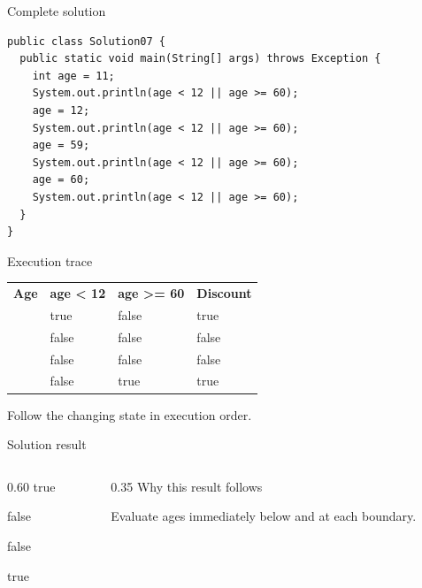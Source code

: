\documentclass[10pt,aspectratio=169]{beamer}
\begin{document}
\begin{frame}[fragile,t]{Complete solution}
\begin{lstlisting}
public class Solution07 {
  public static void main(String[] args) throws Exception {
    int age = 11;
    System.out.println(age < 12 || age >= 60);
    age = 12;
    System.out.println(age < 12 || age >= 60);
    age = 59;
    System.out.println(age < 12 || age >= 60);
    age = 60;
    System.out.println(age < 12 || age >= 60);
  }
}
\end{lstlisting}
\end{frame}

\begin{frame}[fragile,t]{Execution trace}
\small\renewcommand{\arraystretch}{1.5}
\begin{tabularx}{\textwidth}{>{\raggedright\arraybackslash}X>{\raggedright\arraybackslash}X>{\raggedright\arraybackslash}X>{\raggedright\arraybackslash}X}
\rowcolor{navy}
\color{white}\bfseries Age & \color{white}\bfseries age \textless{} 12 & \color{white}\bfseries age \textgreater{}= 60 & \color{white}\bfseries Discount\\
11 & true & false & true\\
12 & false & false & false\\
59 & false & false & false\\
60 & false & true & true\\
\end{tabularx}
\vspace{3mm}\footnotesize Follow the changing state in execution order.
\end{frame}

\begin{frame}[fragile,t]{Solution result}
\begin{columns}[T,onlytextwidth]\begin{column}{0.60\textwidth}
true\par false\par false\par true
\end{column}\begin{column}{0.35\textwidth}\small
Why this result follows

Evaluate ages immediately below and at each boundary.
\end{column}\end{columns}
\end{frame}
\end{document}
